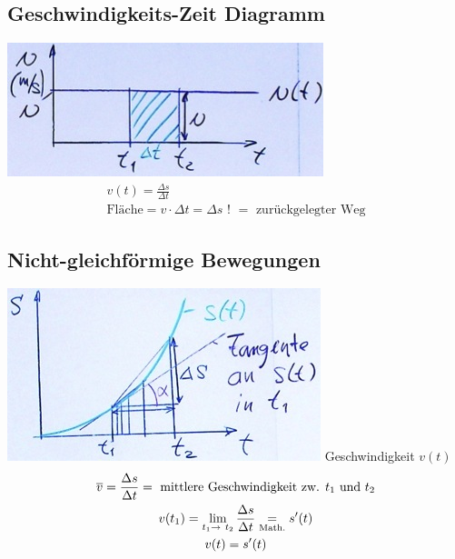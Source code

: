 \subsection{Geschwindigkeits-Zeit Diagramm}
\includegraphics{Bild3}
\begin{gather*}
	v(t) = \frac{\Delta s}{\Delta t} \\
	\text{Fläche} = v \cdot \Delta t = \Delta s \text{ ! } = \text{ zurückgelegter Weg}
\end{gather*}

\subsection{Nicht-gleichförmige Bewegungen}
\includegraphics{Bild4}
Geschwindigkeit $v(t)$
\begin{gather*}
	\overline{v} = \frac{\Delta s}{\Delta t} = \text{ mittlere Geschwindigkeit zw. $t_1$ und $t_2$} \\
	v(t_1) = \lim_{t_1 \rightarrow t_2} \frac{\Delta s}{\Delta t} \underset{\text{\scriptsize{Math.}}}{=} s'(t) \\
	v(t) = s'(t) \\
\end{gather*}

